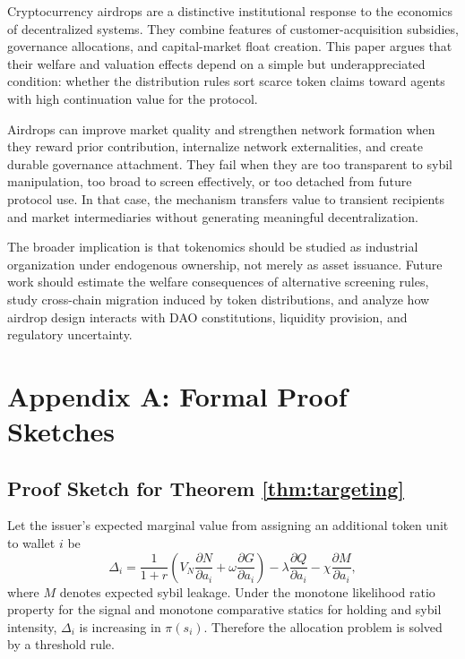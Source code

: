 \documentclass[11pt]{article}
\theoremstyle{remark}
\begin{document}
Cryptocurrency airdrops are a distinctive institutional response to the economics of decentralized systems. They combine features of customer-acquisition subsidies, governance allocations, and capital-market float creation. This paper argues that their welfare and valuation effects depend on a simple but underappreciated condition: whether the distribution rules sort scarce token claims toward agents with high continuation value for the protocol.

Airdrops can improve market quality and strengthen network formation when they reward prior contribution, internalize network externalities, and create durable governance attachment. They fail when they are too transparent to sybil manipulation, too broad to screen effectively, or too detached from future protocol use. In that case, the mechanism transfers value to transient recipients and market intermediaries without generating meaningful decentralization.

The broader implication is that tokenomics should be studied as industrial organization under endogenous ownership, not merely as asset issuance. Future work should estimate the welfare consequences of alternative screening rules, study cross-chain migration induced by token distributions, and analyze how airdrop design interacts with DAO constitutions, liquidity provision, and regulatory uncertainty.

\appendix

\section{Appendix A: Formal Proof Sketches}

\subsection{Proof Sketch for Theorem \ref{thm:targeting}}

Let the issuer's expected marginal value from assigning an additional token unit to wallet $i$ be
\begin{equation}
\Delta_i = \frac{1}{1+r} \left( V_N \frac{\partial N}{\partial a_i} + \omega \frac{\partial G}{\partial a_i} \right)
- \lambda \frac{\partial Q}{\partial a_i} - \chi \frac{\partial M}{\partial a_i},
\end{equation}
where $M$ denotes expected sybil leakage. Under the monotone likelihood ratio property for the signal and monotone comparative statics for holding and sybil intensity, $\Delta_i$ is increasing in $\pi(s_i)$. Therefore the allocation problem is solved by a threshold rule.
\end{document}
